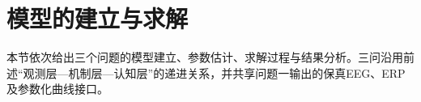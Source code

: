 \section{模型的建立与求解}

本节依次给出三个问题的模型建立、参数估计、求解过程与结果分析。三问沿用前述“观测层—机制层—认知层”的递进关系，并共享问题一输出的保真EEG、ERP及参数化曲线接口。




